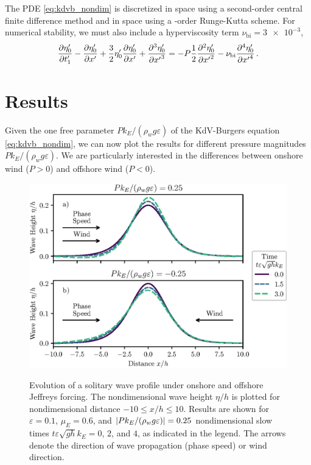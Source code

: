 \documentclass{jfm}
\renewcommand*{\epsilon}{\varepsilon}
\begin{document}
The PDE \cref{eq:kdvb_nondim} is discretized in space using a
second-order central finite difference method and in space using a
-order Runge-Kutta scheme.
For numerical stability, we must also include a hyperviscosity term
$\nu_{\text{bi}} = \num{3e-3}$,
\begin{equation}
  \pdv{\eta'_0}{t'_1} - \pdv{\eta'_0}{x'} + \frac{3}{2}
  \eta'_0 \pdv{\eta'_0}{x'} + \pdv[3]{\eta'_0}{{x'}} =
  -P \frac{1}{2} \pdv[2]{\eta'_0}{{x'}} - \nu_{\text{bi}}
  \pdv[4]{\eta'_0}{{x'}} \,.
\end{equation}

\section{\label{sec:results} Results}
Given the one free parameter $P k_E/(\rho_w g \epsilon)$ of the
KdV-Burgers equation \cref{eq:kdvb_nondim}, we can now plot the results
for different pressure magnitudes $P k_E/(\rho_w g \epsilon)$.
We are particularly interested in the differences between onshore wind
($P > 0$) and offshore wind ($P < 0$).

\begin{figure}
  \centering
  { %
    \label{fig:snapshots_solitary:a}
    \label{fig:snapshots_solitary:b}
  }
  \includegraphics{Snapshots-Positive-Negative-Production.eps}
  \caption{
    Evolution of a solitary wave profile under
    onshore and
    offshore Jeffreys forcing.
    The nondimensional wave height $\eta/h$ is plotted for
    nondimensional distance $-10 \le x/h \le 10$.
    Results are shown for $\epsilon=0.1$, $\mu_E = 0.6$, and $\abs{P
    k_E/(\rho_w g \epsilon)} = 0.25$ nondimensional slow times $t
    \epsilon \sqrt{gh} k_E = 0$, $2$, and $4$, as indicated in the
    legend.
    The arrows denote the direction of wave propagation (phase speed) or
    wind direction.
  }\label{fig:snapshots_solitary}
\end{figure}
\end{document}
